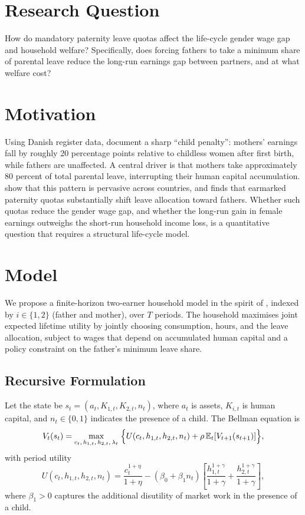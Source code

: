 \section*{Research Question}

How do mandatory paternity leave quotas affect the life-cycle gender wage gap and household welfare? Specifically, does forcing fathers to take a minimum share of parental leave reduce the long-run earnings gap between partners, and at what welfare cost?

\section*{Motivation}

Using Danish register data, \citet{kleven2019children} document a sharp ``child penalty'': mothers' earnings fall by roughly 20 percentage points relative to childless women after first birth, while fathers are unaffected. A central driver is that mothers take approximately 80 percent of total parental leave, interrupting their human capital accumulation. \citet{kleven2019childpenalties} show that this pattern is pervasive across countries, and \citet{patnaik2019reserving} finds that earmarked paternity quotas substantially shift leave allocation toward fathers. Whether such quotas reduce the gender wage gap, and whether the long-run gain in female earnings outweighs the short-run household income loss, is a quantitative question that requires a structural life-cycle model.

\section*{Model}

We propose a finite-horizon two-earner household model in the spirit of \citet{borella2023marriage}, indexed by $i \in \{1,2\}$ (father and mother), over $T$ periods. The household maximises joint expected lifetime utility by jointly choosing consumption, hours, and the leave allocation, subject to wages that depend on accumulated human capital and a policy constraint on the father's minimum leave share.

\subsection*{Recursive Formulation}

Let the state be $s_t = (a_t, K_{1,t}, K_{2,t}, n_t)$, where $a_t$ is assets, $K_{i,t}$ is human capital, and $n_t \in \{0,1\}$ indicates the presence of a child. The Bellman equation is
\begin{equation}
    V_t(s_t) = \max_{c_t,\, h_{1,t},\, h_{2,t},\, \lambda_t}\;\Bigl\{ U(c_t, h_{1,t}, h_{2,t}, n_t) + \rho\,\mathbb{E}_t\!\left[V_{t+1}(s_{t+1})\right]\Bigr\},
\end{equation}
with period utility
\begin{equation}
    U(c_t, h_{1,t}, h_{2,t}, n_t) = \frac{c_t^{1+\eta}}{1+\eta} - (\beta_0 + \beta_1 n_t)\!\left[\frac{h_{1,t}^{1+\gamma}}{1+\gamma} + \frac{h_{2,t}^{1+\gamma}}{1+\gamma}\right],
\end{equation}
where $\beta_1 > 0$ captures the additional disutility of market work in the presence of a child.

